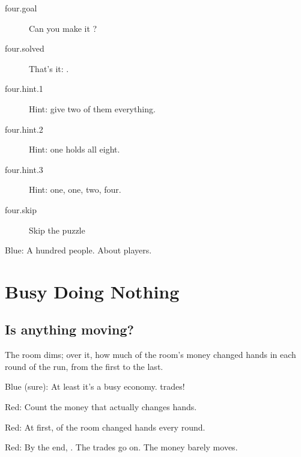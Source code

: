 
\begin{description}
  \item[four.goal] Can you make it ?
  \item[four.solved] That's it: .
  \item[four.hint.1] Hint: give two of them everything.
  \item[four.hint.2] Hint: one holds all eight.
  \item[four.hint.3] Hint: one, one, two, four.
  \item[four.skip] Skip the puzzle
\end{description}


Blue: A hundred people.
About  players.

\section{Busy Doing Nothing}\label{index:much-ado-about-nothing}

\subsection{Is anything moving?}\label{act:turnover}

\label{turnover}

The room dims; over it, how much of the room's money changed hands in each
round of the run, from the first to the last.


Blue (sure): At least it's a busy economy.
 trades!

Red: Count the money that actually changes hands.

Red: At first,  of the room changed hands every round.

Red: By the end, .
The trades go on. The money barely moves.

